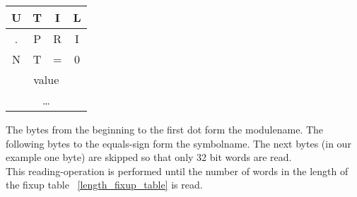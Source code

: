 \begin{center}
	\begin{tabular}{|c|c|c|c|}
		\hline
		U & T & I & L \\
		\hline
		. & P & R & I \\
		\hline
		N & T & = & 0 \\
		\hline 
		\multicolumn{4}{|c|}{value} \\
		\hline
		\multicolumn{4}{|c|}{\ldots} \\
		\hline
	\end{tabular}
\end{center}
The bytes from the beginning to the first dot form the modulename. The following
bytes to the equals-sign form the symbolname. The next bytes (in our example one
byte) are skipped so that only 32 bit words are read. \\
This reading-operation is performed until the number of words in the length of
the fixup table ~\ref{length_fixup_table} is read. 

